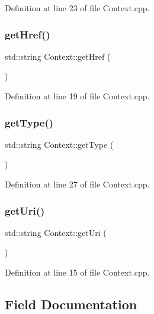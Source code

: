 Definition at line 23 of file Context.\+cpp.

\mbox{\label{class_context_a67a371fecb291b35fb59a86d402cdc27}} 
\subsubsection{\texorpdfstring{get\+Href()}{getHref()}}
{\footnotesize\ttfamily std\+::string Context\+::get\+Href (\begin{DoxyParamCaption}{ }\end{DoxyParamCaption})}



Definition at line 19 of file Context.\+cpp.

\mbox{\label{class_context_a3139e75a0ecea9baaf7b2f00fb49347d}} 
\subsubsection{\texorpdfstring{get\+Type()}{getType()}}
{\footnotesize\ttfamily std\+::string Context\+::get\+Type (\begin{DoxyParamCaption}{ }\end{DoxyParamCaption})}



Definition at line 27 of file Context.\+cpp.

\mbox{\label{class_context_a1c6d50bfa9ffc1311d86e54614644002}} 
\subsubsection{\texorpdfstring{get\+Uri()}{getUri()}}
{\footnotesize\ttfamily std\+::string Context\+::get\+Uri (\begin{DoxyParamCaption}{ }\end{DoxyParamCaption})}



Definition at line 15 of file Context.\+cpp.



\subsection{Field Documentation}
\mbox{\label{class_context_aa4fcf31c4906efd9e107555225a262db}} 
